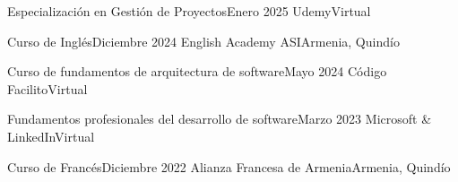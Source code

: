\documentclass[letterpaper,12pt]{fed-res}
\begin{document}
    \resumeSubheading
        {Especialización en Gestión de Proyectos}{Enero 2025}
        {Udemy}{Virtual}

    \resumeSubheading
        {Curso de Inglés}{Diciembre 2024}
        {English Academy ASI}{Armenia, Quindío}

    \resumeSubheading
        {Curso de fundamentos de arquitectura de software}{Mayo 2024}
        {Código Facilito}{Virtual}

    \resumeSubheading
        {Fundamentos profesionales del desarrollo de software}{Marzo 2023}
        {Microsoft \& LinkedIn}{Virtual}

    \resumeSubheading
        {Curso de Francés}{Diciembre 2022}
        {Alianza Francesa de Armenia}{Armenia, Quindío}

\resumeSubHeadingListEnd

\end{document}
